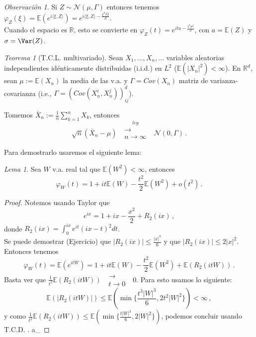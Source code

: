 \documentclass[letterpaper,11pt]{article} %
\theoremstyle{defbreak}
\theoremstyle{propbreak}
\theoremstyle{remark}
\newtheorem{remark}{Observación}[subsection]
\theoremstyle{break}
\newtheorem{theorem}{Teorema}[subsection]
\newtheorem{lemma}{Lema}[subsection]
\def\E{\mathbb{E}}
\def\convley{\mbox{ }\overset{ley}{\substack{\longrightarrow \\n \to \infty}}\mbox{ }}
\def\ejercicio{\color{blue}Ejercicio\color{black}}
\def\gris{\color{mygray}}
\def\findem{\null\hfill\color{white}a\color{black}_\square}
\begin{document}
\begin{remark}
Si $Z\sim\mathcal{N}(\mu,\Gamma)$ entonces tenemos $\varphi_Z(\xi)=\mathbb{E}(e^{i\langle\xi,Z\rangle})=e^{i\langle\xi,Z\rangle-\frac{\xi^T\Gamma\xi}{Z}}$.
\\ Cuando el espacio es $\mathbb{R}$, esto se convierte en $\varphi_Z(t)=e^{ita-\frac{t^2\sigma^2}{Z}}$, con $a=\E(Z)$ y $\sigma=\Var(Z)$.
\end{remark}

\vspace{2cm}
\begin{theorem}[T.C.L. multivariado]
\label{tcl}
Sean $X_1,\dots,X_n,\dots$ variables aleatorias independientes idénticamente distribuidas (i.i.d.) en $L^2$ %
($\mathbb{E}(|X_n|^2)<\infty$). En $\mathbb{R}^d$, sean $\mu:=\mathbb{E}(X_n)$ 
la media de las v.a. y $\Gamma=Cov(X_n)$ matriz de varianza-covarianza (i.e., $\Gamma=(Cov(X_n^i,X_n^j))_{ij}^d$). 

Tomemos $\bar{X}_n:=\displaystyle\frac{1}{n} \sum^n_{k=1}X_k$, entonces
$$ \sqrt{n}(\bar{X}_n-\mu)\mbox{ }\overset{ley}{\substack{\longrightarrow \\n \to \infty}}\mbox{ }\mathcal{N}(0,\Gamma) \, .$$
\end{theorem}
Para demostrarlo usaremos el siguiente lema:
\begin{lemma}
\label{lemma:lema_tcl}
Sea $W$ v.a. real tal que $\mathbb{E}(W^2)<\infty$, entonces $$\varphi_W(t)=1+it\mathbb{E}(W)-\frac{t^2}{2}\mathbb{E}(W^2)+o(t^2) \, .$$
\end{lemma}
\begin{proof}
\gris Notemos usando Taylor que
$$ e^{ix} = \displaystyle 1+ix-\frac{x^2}{2} + R_2(ix) \, ,$$
donde $R_2(ix) = \displaystyle\int_0^{ix}e^{it}(ix-t)^2dt$. 
\\ Se puede demostrar (\ejercicio\gris) que $|R_2(ix)|\leq \frac{|x|^3}{6}$ y que $|R_2(ix)|\leq 2|x|^2$. Entonces tenemos
$$ \varphi_W(t)=\displaystyle\E(e^{itW})=1+it\E(W)-\frac{t^2}{2}\E(W^2)+\E(R_2(itW)) \, .$$
Basta ver que $\displaystyle\frac{1}{t^2}\E(R_2(itW)) \mbox{ }\overset{}{\substack{\longrightarrow \\t \to 0}}\mbox{ }0$. Para esto usamos lo siguiente:
$$\displaystyle \E(|R_2(itW)|) \leq \E(\min\{\frac{t^3|W|^3}{6},2t^2|W|^2\})<\infty \, ,$$ 
y como $\displaystyle\frac{1}{t^2}\E(R_2(itW))\leq \E(\min\{\frac{t|W|^3}{6},2|W|^2\}) $, podemos concluir usando T.C.D. . \findem
\end{proof}
\end{document}
